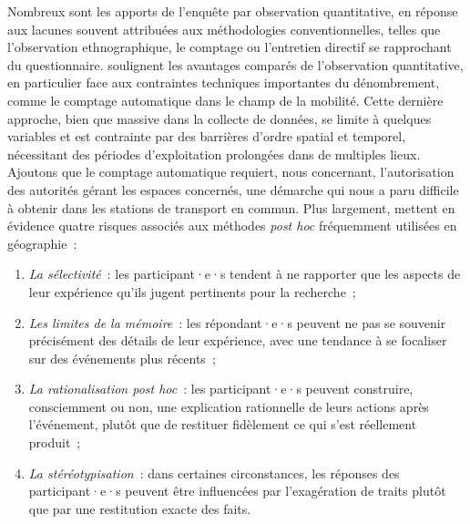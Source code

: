 \begin{refsegment}
Nombreux sont les apports de l'enquête par observation quantitative, en réponse aux lacunes souvent attribuées aux méthodologies conventionnelles, telles que l'observation ethnographique, le comptage ou l'entretien directif se rapprochant du questionnaire. \textcolor{blue}{\textcite[19]{cochoy_bicycles_2019}} soulignent les avantages comparés de l'observation quantitative, en particulier face aux contraintes techniques importantes du dénombrement, comme le comptage automatique dans le champ de la mobilité. Cette dernière approche, bien que massive dans la collecte de données, se limite à quelques variables et est contrainte par des barrières d'ordre spatial et temporel, nécessitant des périodes d'exploitation prolongées dans de multiples lieux. Ajoutons que le comptage automatique requiert, nous concernant, l'autorisation des autorités gérant les espaces concernés, une démarche qui nous a paru difficile à obtenir dans les stations de transport en commun. Plus largement, \textcolor{blue}{\textcite[465]{cotton_using_2010}} mettent en évidence quatre risques associés aux méthodes \textsl{post hoc} fréquemment utilisées en géographie~:
\begin{enumerate}
    \item \textsl{La sélectivité}~: les participant·e·s tendent à ne rapporter que les aspects de leur expérience qu'ils jugent pertinents pour la recherche~;
    \item \textsl{Les limites de la mémoire}~: les répondant·e·s peuvent ne pas se souvenir précisément des détails de leur expérience, avec une tendance à se focaliser sur des événements plus récents~;
    \item \textsl{La rationalisation post hoc}~: les participant·e·s peuvent construire, consciemment ou non, une explication rationnelle de leurs actions après l'événement, plutôt que de restituer fidèlement ce qui s'est réellement produit~;
    \item \textsl{La stéréotypisation}~: dans certaines circonstances, les réponses des participant·e·s peuvent être influencées par l'exagération de traits plutôt que par une restitution exacte des faits.
\end{enumerate}%


\end{refsegment}
